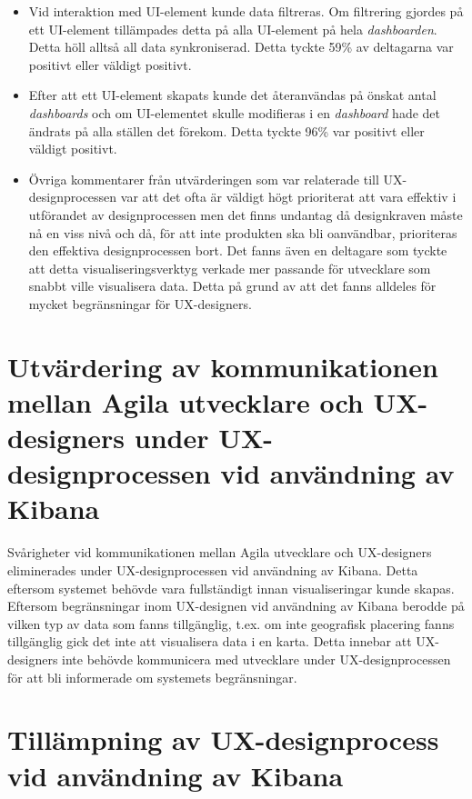 \documentclass[12pt]{kththesis}
\begin{document}
\begin{itemize}
\item Vid interaktion med UI-element kunde data filtreras. Om filtrering gjordes på ett UI-element tillämpades detta på alla UI-element på hela \textit{dashboarden}. Detta höll alltså all data synkroniserad. Detta tyckte 59\% av deltagarna var positivt eller väldigt positivt.

\item Efter att ett UI-element skapats kunde det återanvändas på önskat antal \textit{dashboards} och om UI-elementet skulle modifieras i en \textit{dashboard} hade det ändrats på alla ställen det förekom. Detta tyckte 96\% var positivt eller väldigt positivt.

\item Övriga kommentarer från utvärderingen som var relaterade till UX-designprocessen var att det ofta är väldigt högt prioriterat att vara effektiv i utförandet av designprocessen men det finns undantag då designkraven måste nå en viss nivå och då, för att inte produkten ska bli oanvändbar, prioriteras den effektiva designprocessen bort. Det fanns även en deltagare som tyckte att detta visualiseringsverktyg verkade mer passande för utvecklare som snabbt ville visualisera data. Detta på grund av att det fanns alldeles för mycket begränsningar för UX-designers.
\end{itemize}

\section{Utvärdering av kommunikationen mellan Agila utvecklare och UX-designers under UX-designprocessen vid användning av Kibana}

Svårigheter vid kommunikationen mellan Agila utvecklare och UX-designers eliminerades under UX-designprocessen vid användning av Kibana. Detta eftersom systemet behövde vara fullständigt innan visualiseringar kunde skapas. Eftersom begränsningar inom UX-designen vid användning av Kibana berodde på vilken typ av data som fanns tillgänglig, t.ex. om inte geografisk placering fanns tillgänglig gick det inte att visualisera data i en karta. Detta innebar att UX-designers inte behövde kommunicera med utvecklare under UX-designprocessen för att bli informerade om systemets begränsningar. 

\section{Tillämpning av UX-designprocess vid användning av Kibana}
\end{document}
